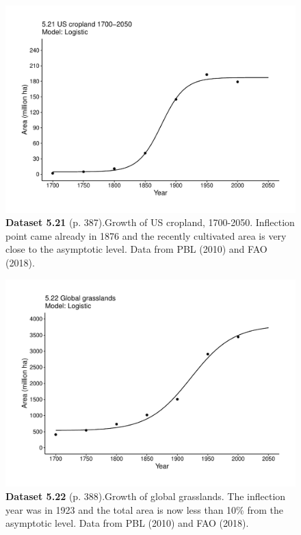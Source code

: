 \documentclass[aps,rmp,preprint,superscriptaddress,10pt,onecolumn]{article}
\begin{document}
\clearpage
\begin{figure}[h]
\includegraphics[width=\textwidth]{output/figs-ggplot/5.21.pdf}
\caption*{\textbf{Dataset 5.21} (p. 387).Growth of US cropland, 1700-2050. Inflection point came already in 1876 and the recently cultivated area is very close to the asymptotic level. Data from PBL (2010) and FAO (2018).}
\end{figure}
	
\clearpage
\begin{figure}[h]
\includegraphics[width=\textwidth]{output/figs-ggplot/5.22.pdf}
\caption*{\textbf{Dataset 5.22} (p. 388).Growth of global grasslands. The inflection year was in 1923 and the total area is now less than 10\% from the asymptotic level. Data from PBL (2010) and FAO (2018).}
\end{figure}
	
\end{document}
